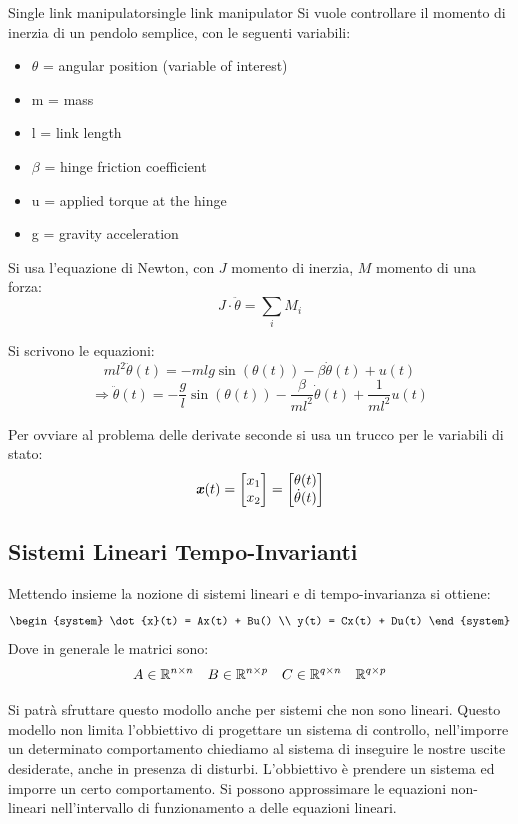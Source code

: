\documentclass[12pt]{article}
\begin{document}
\begin{example}{Single link manipulator}{single link manipulator}
    Si vuole controllare il momento di inerzia di un pendolo semplice, con le seguenti variabili:
    \begin{itemize}
        \item $\theta$ = angular position (variable of interest)
        \item m = mass
        \item l = link length
        \item $\beta$ = hinge friction coefficient
        \item u = applied torque at the hinge 
        \item g = gravity acceleration
    \end{itemize}

    Si usa l'equazione di Newton, con $J$ momento di inerzia, $M$ momento di una forza:
    \[ J \cdot \ddot{\theta} = \sum_i M_i \]

    Si scrivono le equazioni:
    \[ ml^2 \ddot{\theta}(t) = -mlg\sin(\theta(t)) - \beta \dot{\theta}(t) + u(t) \]
    \[ \Rightarrow \ddot{\theta}(t) = -\frac{g}{l} \sin(\theta(t)) - \frac{\beta}{ml^2}\dot{\theta}(t) + \frac{1}{ml^2}u(t) \]
    
    Per ovviare al problema delle derivate seconde si usa un trucco per le variabili di stato:
    \[ \textbf{\textit{x}}(t) = \begin{bmatrix} x_1 \\ x_2 \end{bmatrix} = \begin{bmatrix} \theta(t) \\ \dot{\theta}(t) \end{bmatrix} \]
\end{example}

\subsection{Sistemi Lineari Tempo-Invarianti}
Mettendo insieme la nozione di sistemi lineari e di tempo-invarianza si ottiene:
\[ \begin{system} \dot{x}(t) = Ax(t) + Bu() \\ y(t) = Cx(t) + Du(t) \end{system} \]
Dove in generale le matrici sono:
\[ A \in \mathbb{R}^{n\times n}\quad B \in \mathbb{R}^{n\times p}\quad C \in \mathbb{R}^{q\times n}\quad \mathbb{R}^{q\times p} \]

Si patr\`a sfruttare questo modollo anche per sistemi che non sono lineari. Questo modello non limita l'obbiettivo di progettare un sistema di controllo, nell'imporre un determinato comportamento chiediamo al sistema di inseguire le nostre uscite desiderate, anche in presenza di disturbi. L'obbiettivo \`e prendere un sistema ed imporre un certo comportamento. Si possono approssimare le equazioni non-lineari nell'intervallo di funzionamento a delle equazioni lineari.
\end{document}
